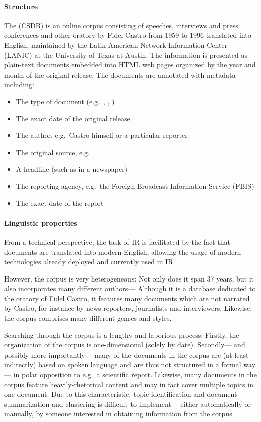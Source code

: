 \paragraph{Structure}
The  (CSDB) is an online corpus consisting of speeches, interviews and press conferences and other oratory by Fidel Castro from 1959 to 1996 translated into English, maintained by the Latin American Network Information Center (LANIC) at the University of Texas at Austin. The information is presented as plain-text documents embedded into HTML web pages organized by the year and month of the original release. The documents are annotated with metadata including:

\begin{itemize}
\item The type of document (e.g.\ , , )
\item The exact date of the original release
\item The author, e.g.\ Castro himself or a particular reporter
\item The original source, e.g.\ 
\item A headline (such as in a newspaper)
\item The reporting agency, e.g.\ the Foreign Broadcast Information Service (FBIS)
\item The exact date of the report
\end{itemize}

\paragraph{Linguistic properties}
From a technical perspective, the task of IR is facilitated by the fact that documents are translated into modern English, allowing the usage of modern technologies already deployed and currently used in IR.

However, the corpus is very heterogeneous: Not only does it span 37 years, but it also incorporates many different authors--- Although it is a database dedicated to the oratory of Fidel Castro, it features many documents which are not narrated by Castro, for instance by news reporters, journalists and interviewers. Likewise, the corpus comprises many different genres and styles.

Searching through the corpus is a lengthy and laborious process: Firstly, the organization of the corpus is one-dimensional (solely by date). Secondly--- and possibly more importantly--- many of the documents in the corpus are (at least indirectly) based on spoken language and are thus not structured in a formal way--- in polar opposition to e.g.\ a scientific report. Likewise, many documents in the corpus feature heavily-rhetorical content and may in fact cover multiple topics in one document. Due to this characteristic, topic identification and document summarization and clustering is difficult to implement--- either automatically or manually, by someone interested in obtaining information from the corpus.